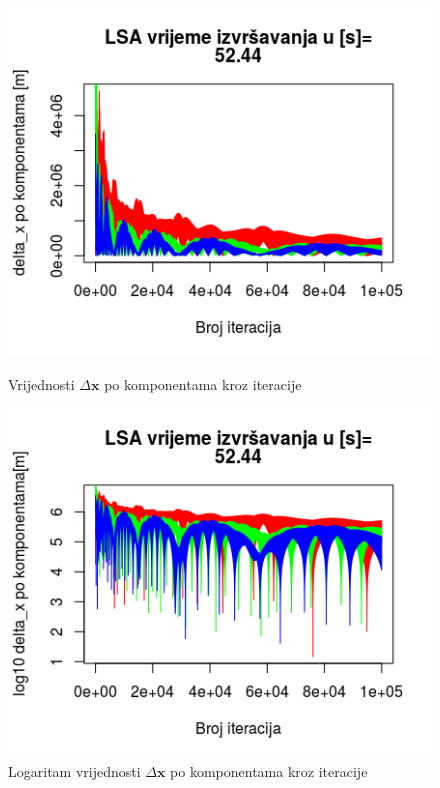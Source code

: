 \documentclass[a4paper,twoside,12pt]{memoir} %
\begin{document}
\begin{figure}[H]
	\begin{minipage}{0.48\textwidth}
		\centering
		\includegraphics[width=1\textwidth]{1LSAdeltab}
		\caption{Vrijednosti $\Delta \mathbf{x}$ po komponentama kroz iteracije}
		\label{fig:1LSAdelta}
	\end{minipage}%
	\hspace{1cm}
	\begin{minipage}{0.48\textwidth}
		
		\includegraphics[width=1\textwidth]{1LSAdeltal10b}
		\caption{Logaritam vrijednosti $\Delta \mathbf{x}$ po komponentama kroz iteracije}
		\label{fig:1LSAdeltal10}
	\end{minipage}%
\end{figure}
\end{document}
